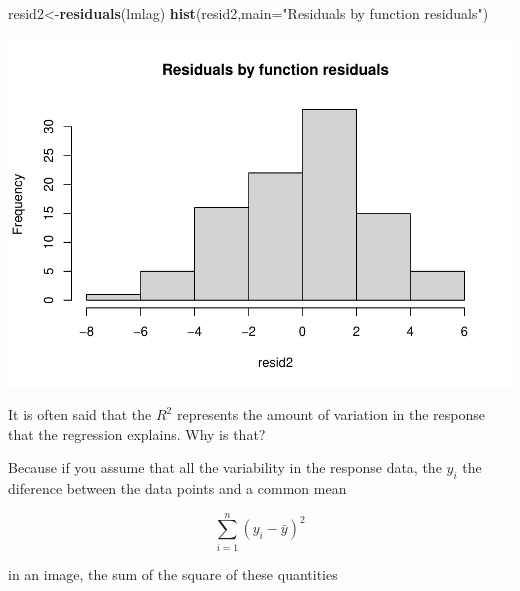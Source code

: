 \documentclass[
]{book}
\newenvironment{Shaded}{\begin{snugshade}}{\end{snugshade}}
\newcommand{\CommentTok}[1]{\textcolor[rgb]{0.56,0.35,0.01}{\textit{#1}}}
\newcommand{\DataTypeTok}[1]{\textcolor[rgb]{0.13,0.29,0.53}{#1}}
\newcommand{\DecValTok}[1]{\textcolor[rgb]{0.00,0.00,0.81}{#1}}
\newcommand{\KeywordTok}[1]{\textcolor[rgb]{0.13,0.29,0.53}{\textbf{#1}}}
\newcommand{\NormalTok}[1]{#1}
\newcommand{\OperatorTok}[1]{\textcolor[rgb]{0.81,0.36,0.00}{\textbf{#1}}}
\newcommand{\StringTok}[1]{\textcolor[rgb]{0.31,0.60,0.02}{#1}}
\begin{document}
\begin{Shaded}
\begin{Highlighting}[]
\NormalTok{resid2<-}\KeywordTok{residuals}\NormalTok{(lmlag)}
\KeywordTok{hist}\NormalTok{(resid2,}\DataTypeTok{main=}\StringTok{"Residuals by function residuals"}\NormalTok{)}
\end{Highlighting}
\end{Shaded}

\includegraphics{ECOMODbook_files/figure-latex/a6.13-1.pdf}

It is often said that the \(R^2\) represents the amount of variation in the response that the regression explains. Why is that?

Because if you assume that all the variability in the response data, the \(y_i\) the diference between the data points and a common mean

\[\sum_{i=1}^n (y_i- \bar y)^2\]

in an image, the sum of the square of these quantities

\begin{Shaded}
\end{Shaded}
\end{document}
